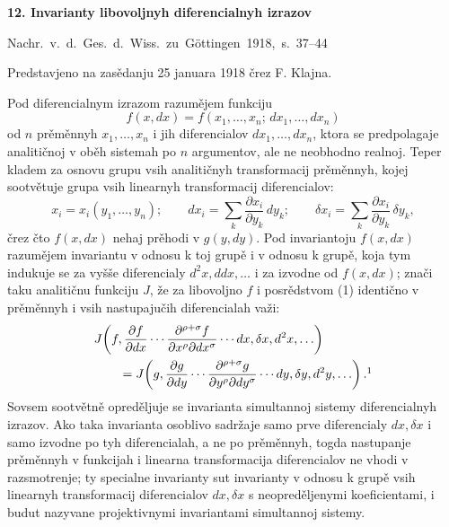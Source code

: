 \documentclass[11pt]{article}
\begin{document}

\begin{center}
{\Large\bfseries 12. Invarianty libovoljnyh diferencialnyh izrazov}\par
\vspace{1.5em}
\mbox{Nachr. v. d. Ges. d. Wiss. zu Göttingen 1918, s. 37--44}
\end{center}

\vspace{3em}
\begin{center}
Predstavjeno na zasědanju 25 januara 1918 črez F. Klajna.
\end{center}

Pod diferencialnym izrazom razumějem funkciju
\[
f(x,dx)=f(x_1,\ldots,x_n;\,dx_1,\ldots,dx_n)
\]
od \(n\) prěměnnyh \(x_1,\ldots,x_n\) i jih diferencialov
\(dx_1,\ldots,dx_n\), ktora se predpolagaje analitičnoj v oběh sistemah po \(n\) argumentov, ale ne neobhodno realnoj. Teper kladem za osnovu grupu vsih analitičnyh transformacij prěměnnyh, kojej sootvětuje grupa vsih linearnyh transformacij diferencialov:
\begin{equation}
x_i=x_i(y_1,\ldots,y_n);\qquad
dx_i=\sum_k\frac{\partial x_i}{\partial y_k}\,dy_k;\qquad
\delta x_i=\sum_k\frac{\partial x_i}{\partial y_k}\,\delta y_k,
\tag{1}
\end{equation}
črez čto \(f(x,dx)\) nehaj prěhodi v \(g(y,dy)\). Pod invariantoju \(f(x,dx)\) razumějem invariantu v odnosu k toj grupě i v odnosu k grupě, koja tym indukuje se za vyšše diferencialy \(d^2x,ddx,\ldots\) i za izvodne od \(f(x,dx)\); znači taku analitičnu funkciju \(J\), že za libovoljno \(f\) i posrědstvom (1) identično v prěměnnyh i vsih nastupajučih diferencialah važi:
\[
\begin{aligned}
&J\!\left(f,\frac{\partial f}{\partial dx}\cdots
\frac{\partial^{\rho+\sigma}f}{\partial x^\rho\partial dx^\sigma}
\cdots dx,\delta x,d^2x,\ldots\right)\\
&\qquad =
J\!\left(g,\frac{\partial g}{\partial dy}\cdots
\frac{\partial^{\rho+\sigma}g}{\partial y^\rho\partial dy^\sigma}
\cdots dy,\delta y,d^2y,\ldots\right).\footnotemark
\end{aligned}
\]
Sovsem sootvětně opreděljuje se invarianta simultannoj sistemy diferencialnyh izrazov. Ako taka invarianta osoblivo sadržaje samo prve diferencialy \(dx,\delta x\) i samo izvodne po tyh diferencialah, a ne po prěměnnyh, togda nastupanje prěměnnyh v funkcijah i linearna transformacija diferencialov ne vhodi v razsmotrenje; ty specialne invarianty sut invarianty v odnosu k grupě vsih linearnyh transformacij diferencialov \(dx,\delta x\) s neopreděljenymi koeficientami, i budut nazyvane projektivnymi invariantami simultannoj sistemy.
\end{document}
